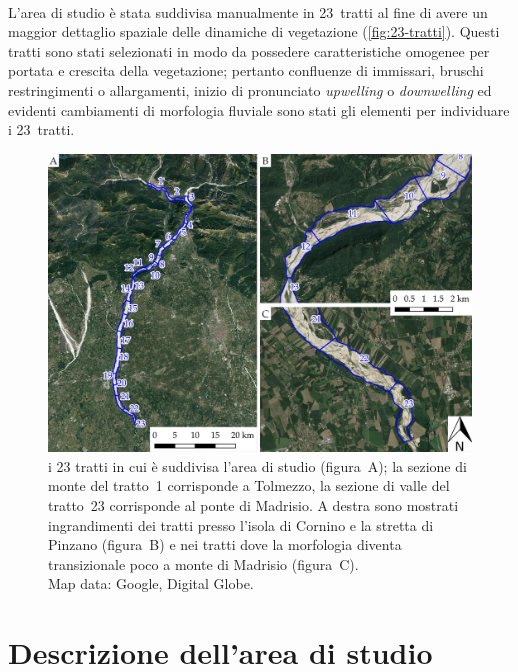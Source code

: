 %
\\
L'area di studio è stata suddivisa manualmente in 23~tratti al fine di avere un maggior dettaglio spaziale delle dinamiche di vegetazione (\vref{fig:23-tratti}). 
Questi tratti sono stati selezionati in modo da possedere caratteristiche omogenee per portata e crescita della vegetazione; 
pertanto confluenze di immissari, bruschi restringimenti o allargamenti, inizio di pronunciato \emph{upwelling} o \emph{downwelling} ed evidenti cambiamenti di morfologia fluviale sono stati gli elementi per individuare i 23~tratti.
%
\begin{figure}
	\centering
	\includegraphics[width=\textwidth]{files/tutti_23_tratti.jpeg}
	\caption[i 23 tratti in cui è suddivisa l'area di studio]{i 23 tratti in cui è suddivisa l'area di studio (figura~A); la sezione di monte del tratto~1 corrisponde a Tolmezzo, la sezione di valle del tratto~23 corrisponde al ponte di Madrisio. A destra sono mostrati ingrandimenti dei tratti presso l'isola di Cornino e la stretta di Pinzano (figura~B) e nei tratti dove la morfologia diventa transizionale poco a monte di Madrisio (figura~C).
	\\
	Map data: Google, Digital Globe.}
	\label{fig:23-tratti}
\end{figure}


\section{Descrizione dell'area di studio}
\label{sec:descr-area-studio}

